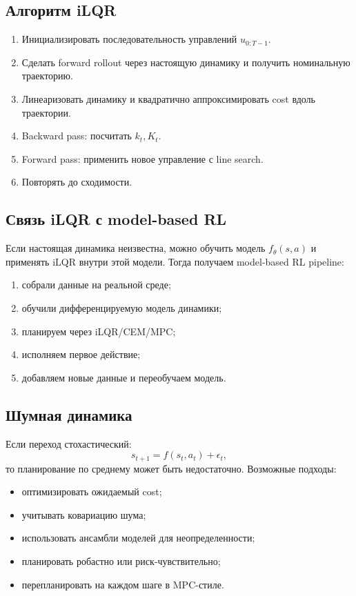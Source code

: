 \documentclass[11pt,a4paper]{article}
\newcommand{\1}{\mathbf{1}}
\begin{document}
\subsection*{Алгоритм iLQR}
\begin{enumerate}
    \item Инициализировать последовательность управлений $u_{0:T-1}$.
    \item Сделать forward rollout через настоящую динамику и получить номинальную траекторию.
    \item Линеаризовать динамику и квадратично аппроксимировать cost вдоль траектории.
    \item Backward pass: посчитать $k_t,K_t$.
    \item Forward pass: применить новое управление с line search.
    \item Повторять до сходимости.
\end{enumerate}

\subsection*{Связь iLQR с model-based RL}
Если настоящая динамика неизвестна, можно обучить модель $f_\theta(s,a)$ и применять iLQR внутри этой модели. Тогда получаем model-based RL pipeline:
\begin{enumerate}
    \item собрали данные на реальной среде;
    \item обучили дифференцируемую модель динамики;
    \item планируем через iLQR/CEM/MPC;
    \item исполняем первое действие;
    \item добавляем новые данные и переобучаем модель.
\end{enumerate}

\subsection*{Шумная динамика}
Если переход стохастический:
\[
    s_{t+1}=f(s_t,a_t)+\epsilon_t,
\]
то планирование по среднему может быть недостаточно. Возможные подходы:
\begin{itemize}
    \item оптимизировать ожидаемый cost;
    \item учитывать ковариацию шума;
    \item использовать ансамбли моделей для неопределенности;
    \item планировать робастно или риск-чувствительно;
    \item перепланировать на каждом шаге в MPC-стиле.
\end{itemize}
\end{document}
